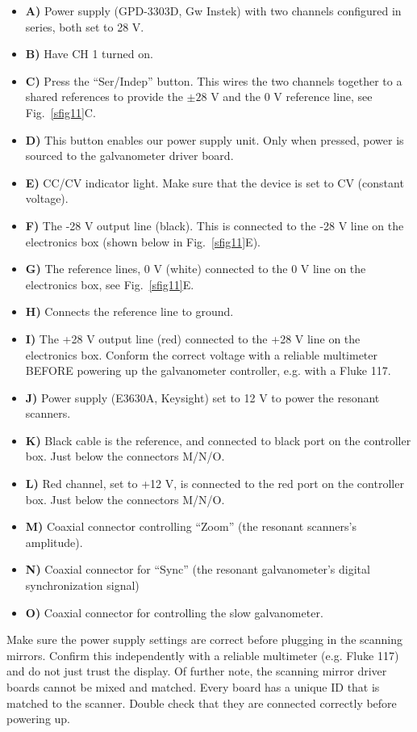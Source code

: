 \documentclass[10pt,letterpaper]{article}
\begin{document}
\begin{itemize}
    \item \textbf{A)} Power supply (GPD-3303D, Gw Instek) with two channels configured in series, both set to 28 V.
    \item \textbf{B)} Have CH 1 turned on.
    \item \textbf{C)} Press the ``Ser/Indep'' button. This wires the two channels together to a shared references to provide the $\pm 28\text{ V}$ and the 0 V reference line, see Fig.~\ref{sfig11}C.
    \item \textbf{D)} This button enables our power supply unit. Only when pressed, power is sourced to the galvanometer driver board.
    \item \textbf{E)} CC/CV indicator light. Make sure that the device is set to CV (constant voltage).
    \item \textbf{F)} The -28 V output line (black). This is connected to the -28 V line on the electronics box (shown below in Fig.~\ref{sfig11}E).
    \item \textbf{G)} The reference lines, 0 V (white) connected to the 0 V line on the electronics box, see Fig.~\ref{sfig11}E.
    \item \textbf{H)} Connects the reference line to ground.
    \item \textbf{I)} The +28 V output line (red) connected to the +28 V line on the electronics box. Conform the correct voltage with a reliable multimeter BEFORE powering up the galvanometer controller, e.g. with a Fluke 117.
    \item \textbf{J)} Power supply (E3630A, Keysight) set to 12 V to power the resonant scanners.
    \item \textbf{K)} Black cable is the reference, and connected to black port on the controller box. Just below the connectors M/N/O.
    \item \textbf{L)} Red channel, set to +12 V, is connected to the red port on the controller box. Just below the connectors M/N/O.
    \item \textbf{M)} Coaxial connector controlling ``Zoom'' (the resonant scanners's amplitude).
    \item \textbf{N)} Coaxial connector for ``Sync'' (the resonant galvanometer's digital synchronization signal)
    \item \textbf{O)} Coaxial connector for controlling the slow galvanometer.
\end{itemize}
Make sure the power supply settings are correct before plugging in the scanning mirrors. Confirm this independently with a reliable multimeter (e.g. Fluke 117) and do not just trust the display. Of further note, the scanning mirror driver boards cannot be mixed and matched. Every board has a unique ID that is matched to the scanner. Double check that they are connected correctly before powering up.
\end{document}

